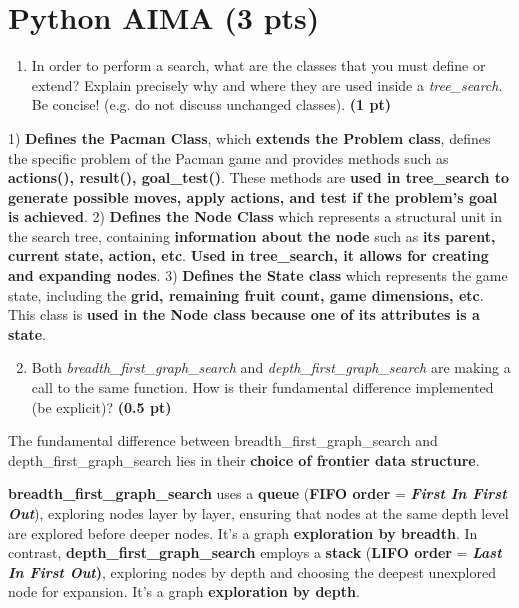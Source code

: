\documentclass[11pt,a4paper]{report}
\begin{document}
\maketitle

\section{Python AIMA (3 pts)}

\begin{enumerate}
  \item In order to perform a search, what are the classes that you must define or extend? Explain precisely why and where they are used inside a \textit{tree\_search}. Be concise! (e.g. do not discuss unchanged classes). \textbf{(1 pt)}
\end{enumerate}

\begin{answer}
{\small 1) \textbf{Defines the Pacman Class}, which \textbf{extends the Problem class}, defines the specific problem of the Pacman game and provides methods such as \textbf{actions(), result(), goal\_test()}. These methods are \textbf{used in tree\_search to generate possible moves, apply actions, and test if the problem's goal is achieved}.
2) \textbf{Defines the Node Class} which represents a structural unit in the search tree, containing \textbf{information about the node} such as \textbf{its parent, current state, action, etc}. \textbf{Used in tree\_search, it allows for creating and expanding nodes}.
3) \textbf{Defines the State class} which represents the game state, including the \textbf{grid, remaining fruit count, game dimensions, etc}. This class is \textbf{used in the Node class because one of its attributes is a state}.}
\end{answer}



\begin{enumerate}
\setcounter{enumi}{1}
    \item Both \textit{breadth\_first\_graph\_search} and \textit{depth\_first\_graph\_search} are making a call to the same function. How is their fundamental difference implemented (be explicit)? \textbf{(0.5 pt)}
\end{enumerate}

\begin{answer}
The fundamental difference between breadth\_first\_graph\_search and depth\_first\_graph\_search lies in their \textbf{choice of frontier data structure}.

\textbf{breadth\_first\_graph\_search} uses a \textbf{queue} (\textbf{FIFO order} = \textbf{\textit{First In First Out}}), exploring nodes layer by layer, ensuring that nodes at the same depth level are explored before deeper nodes. It's a graph \textbf{exploration by breadth}.
In contrast, \textbf{depth\_first\_graph\_search} employs a \textbf{stack} (\textbf{LIFO order} = \textbf{\textit{Last In First Out})}, exploring nodes by depth and choosing the deepest unexplored node for expansion. It's a graph \textbf{exploration by depth}.
\end{answer}
\end{document}
